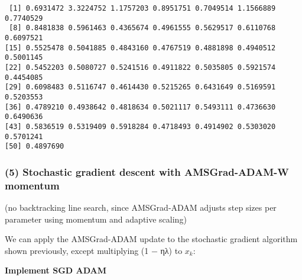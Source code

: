 \documentclass[
  letterpaper,
  DIV=11,
  numbers=noendperiod]{scrartcl}
\begin{document}
\begin{verbatim}
 [1] 0.6931472 3.3224752 1.1757203 0.8951751 0.7049514 1.1566889 0.7740529
 [8] 0.8481838 0.5961463 0.4365674 0.4961555 0.5629517 0.6110768 0.6097521
[15] 0.5525478 0.5041885 0.4843160 0.4767519 0.4881898 0.4940512 0.5001145
[22] 0.5452203 0.5080727 0.5241516 0.4911822 0.5035805 0.5921574 0.4454085
[29] 0.6098483 0.5116747 0.4614430 0.5215265 0.6431649 0.5169591 0.5203553
[36] 0.4789210 0.4938642 0.4818634 0.5021117 0.5493111 0.4736630 0.6490636
[43] 0.5836519 0.5319409 0.5918284 0.4718493 0.4914902 0.5303020 0.5701241
[50] 0.4897690
\end{verbatim}

\subsubsection{(5) Stochastic gradient descent with AMSGrad-ADAM-W
momentum}\label{stochastic-gradient-descent-with-amsgrad-adam-w-momentum}

(no backtracking line search, since AMSGrad-ADAM adjusts step sizes per
parameter using momentum and adaptive scaling)

We can apply the AMSGrad-ADAM update to the stochastic gradient
algorithm shown previously, except multiplying (1 − ηλ) to \(x_k\):

\textbf{Implement SGD ADAM}
\end{document}
